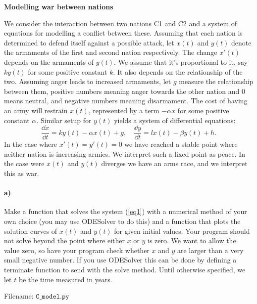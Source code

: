 \begin{Problem}{\textbf{Modelling war between nations}}

\noindent We consider the interaction between two nations C1 and C2 and
a system of equations for modelling a conflict between these.  %
Assuming that each nation is determined  to defend itself against a possible attack,
let $x(t)$ and $y(t)$ denote the armaments of
the first and second nation respectively. The change $x'(t)$ depends on the armaments of
$y(t)$. We assume that it's proportional to it, say $k y(t)$ for some positive constant
$k$. It also depends on the relationship of the two. Assuming anger
leads to increased armaments, let $g$ measure the relationship between them, positive
numbers meaning anger towards the other nation and 0 means neutral, and negative
numbers meaning disarmament.
The cost of having an army will restrain $x(t)$, represented by
a term $-\alpha x$ for some positive constant $\alpha$. Similar setup for $y(t)$ yields a
system of differential equations:
\begin{equation} \label{eq1}
    \frac{\dd x}{\dd t} = ky(t)-\alpha x(t) + g, \quad
    \frac{\dd y}{\dd t} = lx(t)-\beta y(t)+h.
\end{equation}
In the case where $x'(t)=y'(t)=0$ we have reached a stable point where neither
nation is increasing armies. We interpret such a fixed point as peace. In the case were $x(t)$
and $y(t)$ diverges we have an arms race, and we interpret this as war.

\paragraph{a)}
Make a function that solves the system (\ref{eq1}) with a numerical method
of your own choice (you may use ODESolver to do this) and a function that
plots the solution curves of $x(t)$ and $y(t)$ for given initial values.
Your program should not solve beyond the point where either $x$ or $y$ is zero.
We want to allow the value zero,
so have your program check whether $x$ and $y$ are larger than a very small negative number.
If you use ODESolver this can be done by defining a terminate function to send
with the solve method. Until otherwise specified, we let $t$ be the time measured in years.

Filename: $\texttt{C\_model.py}$


\end{Problem}
